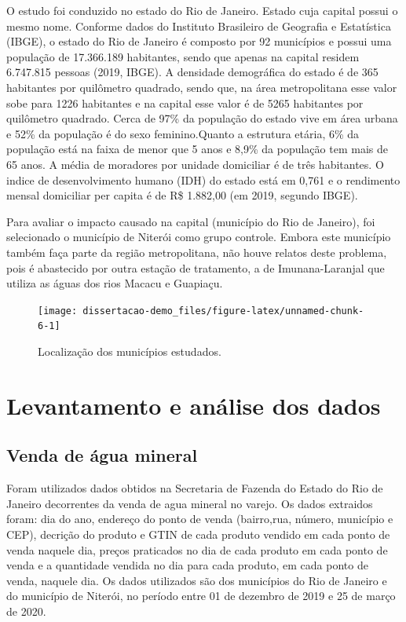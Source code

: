 \documentclass[
  12pt,
]{book}
\begin{document}
O estudo foi conduzido no estado do Rio de Janeiro. Estado cuja capital possui o mesmo nome. Conforme dados do Instituto Brasileiro de Geografia e Estatística (IBGE), o estado do Rio de Janeiro é composto por 92 municípios e possui uma população de 17.366.189 habitantes, sendo que apenas na capital residem 6.747.815 pessoas (2019, IBGE). A densidade demográfica do estado é de 365 habitantes por quilômetro quadrado, sendo que, na área metropolitana esse valor sobe para 1226 habitantes e na capital esse valor é de 5265 habitantes por quilômetro quadrado. Cerca de 97\% da população do estado vive em área urbana e 52\% da população é do sexo feminino.Quanto a estrutura etária, 6\% da população está na faixa de menor que 5 anos e 8,9\% da população tem mais de 65 anos. A média de moradores por unidade domiciliar é de três habitantes. O indice de desenvolvimento humano (IDH) do estado está em 0,761 e o rendimento mensal domiciliar per capita é de R\$ 1.882,00 (em 2019, segundo IBGE).

Para avaliar o impacto causado na capital (município do Rio de Janeiro), foi selecionado o município de Niterói como grupo controle. Embora este município também faça parte da região metropolitana, não houve relatos deste problema, pois é abastecido por outra estação de tratamento, a de Imunana-Laranjal que utiliza as águas dos rios Macacu e Guapiaçu.

\begin{figure}

{\centering \texttt{[image: dissertacao-demo\_files/figure-latex/unnamed-chunk-6-1]} 

}

\caption{Localização dos municípios estudados.}\label{fig:unnamed-chunk-6}
\end{figure}

\hypertarget{levantamento-e-anuxe1lise-dos-dados}{%
\section{Levantamento e análise dos dados}\label{levantamento-e-anuxe1lise-dos-dados}}

\hypertarget{venda-de-uxe1gua-mineral}{%
\subsection{Venda de água mineral}\label{venda-de-uxe1gua-mineral}}

Foram utilizados dados obtidos na Secretaria de Fazenda do Estado do Rio de Janeiro decorrentes da venda de agua mineral no varejo. Os dados extraidos foram: dia do ano, endereço do ponto de venda (bairro,rua, número, município e CEP), decrição do produto e GTIN de cada produto vendido em cada ponto de venda naquele dia, preços praticados no dia de cada produto em cada ponto de venda e a quantidade vendida no dia para cada produto, em cada ponto de venda, naquele dia. Os dados utilizados são dos municípios do Rio de Janeiro e do município de Niterói, no período entre 01 de dezembro de 2019 e 25 de março de 2020.
\end{document}
